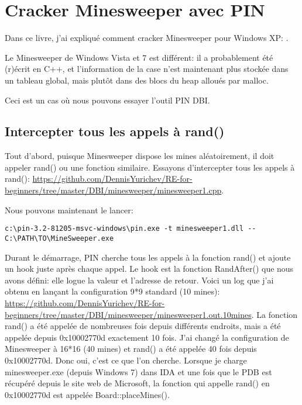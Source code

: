 \section{Cracker Minesweeper avec PIN}

\newcommand{\GitHubMinesweeperURL}{https://github.com/DennisYurichev/RE-for-beginners/tree/master/DBI/minesweeper}

Dans ce livre, j'ai expliqué comment cracker Minesweeper pour Windows XP: .

Le Minesweeper de Windows Vista et 7 est différent: il a probablement été (r)écrit
en C++, et l'information de la case n'est maintenant plus stockée dans un tableau
global, mais plutôt dans des blocs du heap alloués par malloc.

Ceci est un cas où nous pouvons essayer l'outil PIN DBI.

\subsection{Intercepter tous les appels à rand()}

Tout d'abord, puisque Minesweeper dispose les mines aléatoirement, il doit appeler
rand() ou une fonction similaire.
Essayons d'intercepter tous les appels à rand(): \url{\GitHubMinesweeperURL/minesweeper1.cpp}.

Nous pouvons maintenant le lancer:

\begin{lstlisting}
c:\pin-3.2-81205-msvc-windows\pin.exe -t minesweeper1.dll -- C:\PATH\TO\MineSweeper.exe
\end{lstlisting}

Durant le démarrage, PIN cherche tous les appels à la fonction rand() et ajoute un
hook juste après chaque appel.
Le hook est la fonction RandAfter() que nous avons défini: elle logue la valeur et l'adresse
de retour.
Voici un log que j'ai obtenu en lançant la configuration 9*9 standard (10 mines):
 \url{\GitHubMinesweeperURL/minesweeper1.out.10mines}.
La fonction rand() a été appelée de nombreuses fois depuis différents endroits, mais
a été appelée depuis 0x10002770d exactement 10 fois.
J'ai changé la configuration de Minesweeper à 16*16 (40 mines) et rand() a été appelée
40 fois depuis 0x10002770d.
Donc oui, c'est ce que l'on cherche.
Lorsque je charge minesweeper.exe (depuis Windows 7) dans IDA et une fois que le
PDB est récupéré depuis le site web de Microsoft, la fonction qui appelle rand()
en 0x10002770d est appelée Board::placeMines().


